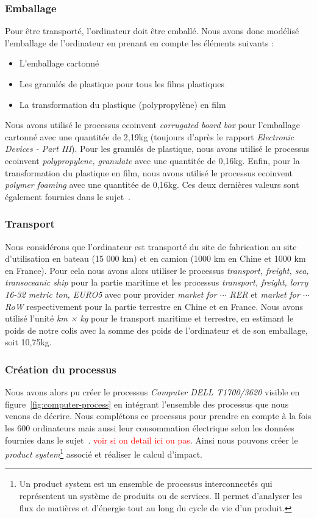 \documentclass[12pt,a4paper]{paper}
\begin{document}
\subsubsection{Emballage}
Pour être transporté, l'ordinateur doit être emballé. Nous avons donc modélisé l'emballage de l'ordinateur en prenant en compte les éléments suivants :
\begin{itemize}
    \item L'emballage cartonné
    \item Les granulés de plastique pour tous les films plastiques
    \item La transformation du plastique (polypropylène) en film
\end{itemize}
Nous avons utilisé le processus ecoinvent \textit{corrugated board box} pour l'emballage cartonné avec une quantitée de 2,19kg (toujours d'après le rapport \textit{Electronic Devices - Part III}\cite{Lehmann2007}). Pour les granulés de plastique, nous avons utilisé le processus ecoinvent \textit{polypropylene,
granulate} avec une quantitée de 0,16kg. Enfin, pour la transformation du plastique en film, nous avons utilisé le processus ecoinvent \textit{polymer foaming} avec une quantitée de 0,16kg. Ces deux dernières valeurs sont également fournies dans le sujet~\cite{TP2_ACV_ENSEIRB-MATMECA}.

\subsubsection{Transport}
Nous considérons que l'ordinateur est transporté du site de fabrication au site d'utilisation en bateau (15 000 km) et en camion (1000 km en Chine et 1000 km en France). Pour cela nous avons alors utiliser le processus \textit{transport, freight, sea, transoceanic ship} pour la partie maritime et les processus \textit{transport, freight, lorry 16-32 metric ton, EURO5} avec pour provider \textit{market for $\cdots$ RER} et \textit{market for $\cdots$ RoW} respectivement pour la partie terrestre en Chine et en France. Nous avons utilisé l'unité \textit{km × kg} pour le transport maritime et terrestre, en estimant le poids de notre colis avec la somme des poids de l'ordinateur et de son emballage, soit 10,75kg.


\subsubsection{Création du processus}
Nous avons alors pu créer le processus \textit{Computer DELL T1700/3620} visible en figure~\ref{fig:computer-process} en intégrant l'ensemble des processus que nous venons de décrire. Nous complétons ce processus pour prendre en compte à la fois les 600 ordinateurs mais aussi leur consommation électrique selon les données fournies dans le sujet~\cite{TP2_ACV_ENSEIRB-MATMECA}. \textcolor{red}{voir si on detail ici ou pas}. Ainsi nous pouvons créer le \textit{product system}\footnote{Un product system est un ensemble de processus interconnectés qui représentent un système de produits ou de services. Il permet d'analyser les flux de matières et d'énergie tout au long du cycle de vie d'un produit.} associé et réaliser le calcul d'impact.
\end{document}
